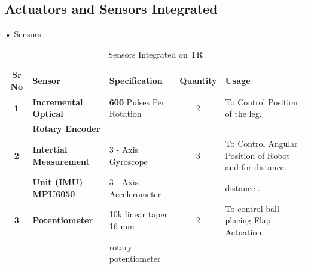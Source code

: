     \subsection{Actuators and Sensors Integrated}
            •  Sensors
            \begin{table}[h]
                \caption {Sensors Integrated on TR} \label{Sensors_TR}  \small
                \begin{tabular}{|c|l|l|c|l|}
                    \hline  \hline
                    \textbf{Sr No}  & \textbf{Sensor}                   & \textbf{Specification}                & \textbf{Quantity} & \textbf{Usage}                                            \\ \hline   \hline                    
                    \textbf{1}      & \textbf{Incremental Optical}      & \textbf{600} Pulses Per Rotation      &        2          & To Control Position of the leg.                           \\
                                    & \textbf{Rotary Encoder}           &                                       &                   &                                                           \\ \hline         
                    \textbf{2}      & \textbf{Intertial Measurement}    & 3 - Axis Gyroscope                    &        3          & To Control Angular Position of  Robot and for distance.   \\ 
                                    & \textbf{Unit (IMU) MPU6050}       & 3 - Axis Accelerometer                &                   & distance .                                                \\ \hline 
                    \textbf{3}      & \textbf{Potentiometer}            & 10k linear taper 16 mm                &        2          & To control ball placing Flap Actuation.                   \\
                                    &                                   & rotary potentiometer                  &                   &                                                           \\ \hline

\end{tabular}
\end{table}
